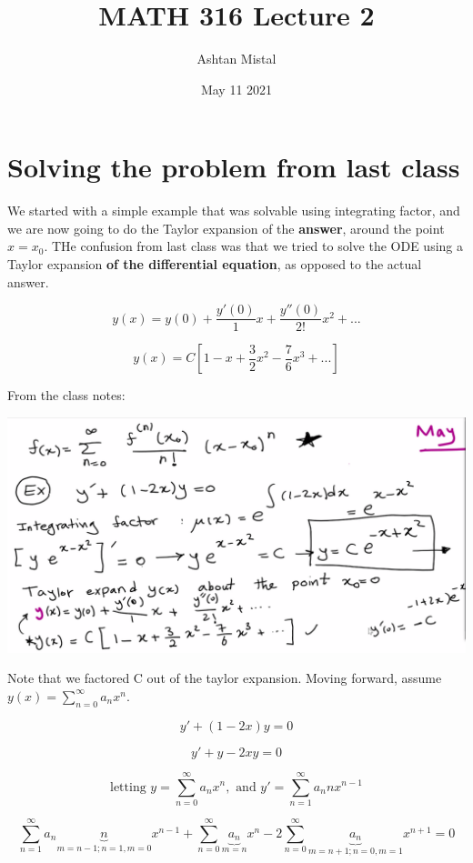 \documentclass{article}
\title{MATH 316 Lecture 2}
\author{Ashtan Mistal}
\date{May 11 2021}
\begin{document}
\ifstandalone
\maketitle
\fi

\graphicspath{{./Lecture02/}}

\section{Solving the problem from last class}

We started with a simple example that was solvable using integrating factor, and we are now going to do the Taylor expansion of the \textbf{answer}, around the point $x = x_0$. THe confusion from last class was that we tried to solve the ODE using a Taylor expansion \textbf{of the differential equation}, as opposed to the actual answer. 

$$y(x) = y(0) + \frac{y'(0)}{1} x + \frac{y''(0)}{2!} x^2 + ...$$

$$y(x) = C \left[1 - x + \frac{3}{2} x^2 - \frac{7}{6} x^3 + ... \right]$$

From the class notes:

\includegraphics[width = 0.9 \textwidth]{image1.png}

Note that we factored C out of the taylor expansion. Moving forward, assume $y(x) = \sum_{n = 0}^{\infty} a_n x^n$. 

$$y' + (1 - 2x) y = 0$$

$$y' + y - 2xy = 0$$

$$\text{letting } y = \sum_{n = 0}^{\infty} a_n x^n, \text{ and } y' = \sum_{n = 1}^{\infty} a_n n x^{n-1}$$

$$\sum_{n = 1}^{\infty} a_n \underbrace{n}_{m = n-1; n = 1, m = 0} x^{n-1} + \sum_{n = 0}^{\infty} \underbrace{a_n}_{m = n} x^n - 2 \sum_{n = 0}^{\infty} \underbrace{a_n}_{m = n+1;  n = 0, m = 1} x^{n+1} = 0$$
\end{document}
